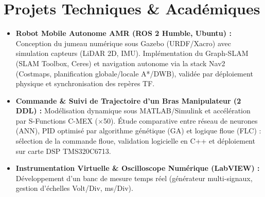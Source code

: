 \documentclass[10pt, a4paper]{article}
\begin{document}
\section*{Projets Techniques \& Académiques}
\begin{itemize}[leftmargin=*, itemsep=0.4ex, parsep=0pt]
	
	\item {\color{primary}\textbf{Robot Mobile Autonome AMR (ROS 2 Humble, Ubuntu) :}} %
	      Conception du jumeau numérique sous Gazebo (URDF/Xacro) avec simulation capteurs (LiDAR 2D, IMU). %
	      Implémentation du Graph-SLAM (SLAM Toolbox, Ceres) et navigation autonome via la stack Nav2 (Costmaps, %
	      planification globale/locale A*/DWB), validée par déploiement physique et synchronisation des repères TF. %

	\item {\color{primary}\textbf{Commande \& Suivi de Trajectoire d'un Bras Manipulateur (2 DDL) :}} %
	      Modélisation dynamique sous MATLAB/Simulink et accélération par S-Functions C-MEX ($\times$50). %
	      Étude comparative entre réseau de neurones (ANN), PID optimisé par algorithme génétique (GA) et logique %
	      floue (FLC) : sélection de la commande floue, validation logicielle en C++ et déploiement sur carte DSP TMS320C6713. %
	\item {\color{primary}\textbf{Instrumentation Virtuelle \& Oscilloscope Numérique (LabVIEW) :}} %
	      Développement d'un banc de mesure temps réel (générateur multi-signaux, gestion d'échelles Volt/Div, ms/Div). %


\end{itemize}



\end{document}
